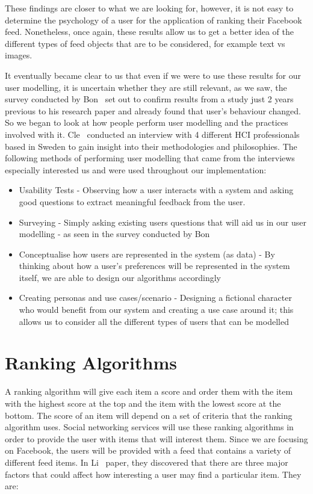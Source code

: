 These findings are closer to what we are looking for, however, it is not easy to determine the psychology of a user for the application of ranking their Facebook feed. Nonetheless, once again, these results allow us to get a better idea of the different types of feed objects that are to be considered, for example text vs images.

It eventually became clear to us that even if we were to use these results for our user modelling, it is uncertain whether they are still relevant, as we saw, the survey conducted by Bon~\cite{bonds2010myspace} set out to confirm results from a study just 2 years previous to his research paper and already found that user's behaviour changed. So we began to look at how people perform user modelling and the practices involved with it. Cle~\cite{clemmensen2004four} conducted an interview with 4 different HCI professionals based in Sweden to gain insight into their methodologies and philosophies. The following methods of performing user modelling that came from the interviews especially interested us and were used throughout our implementation:

\begin{itemize}
\item Usability Tests - Observing how a user interacts with a system and asking good questions to extract meaningful feedback from the user.
\item Surveying - Simply asking existing users questions that will aid us in our user modelling - as seen in the survey conducted by Bon~\cite{bonds2010myspace}
\item Conceptualise how users are represented in the system (as data) - By thinking about how a user's preferences will be represented in the system itself, we are able to design our algorithms accordingly
\item Creating personas and use cases/scenario - Designing a fictional character who would benefit from our system and creating a use case around it; this allows us to consider all the different types of users that can be modelled
\end{itemize}

\newpage
\section{Ranking Algorithms}

A ranking algorithm will give each item a score and order them with the item with the highest score at the top and the item with the lowest score at the bottom. The score of an item will depend on a set of criteria that the ranking algorithm uses. Social networking services will use these ranking algorithms in order to provide the user with items that will interest them. Since we are focusing on Facebook, the users will be provided with a feed that contains a variety of different feed items. In Li~\cite{LiTiaLee2010} paper, they discovered that there are three major factors that could affect how interesting a user may find a particular item. They are:

